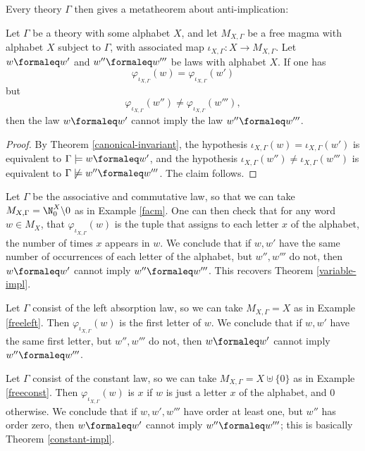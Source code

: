 Every theory $\Gamma$ then gives a metatheorem about anti-implication:

\begin{corollary}\label{anti-impl}
  Let $\Gamma$ be a theory with some alphabet $X$, and let $M_{X,\Gamma}$ be a free magma with alphabet $X$ subject to $\Gamma$, with associated map $\iota_{X,\Gamma}: X \to M_{X,\Gamma}$. Let $w \formaleq w'$ and $w'' \formaleq w'''$ be laws with alphabet $X$. If one has
  \[
  \varphi_{\iota_{X,\Gamma}}(w) = \varphi_{\iota_{X,\Gamma}}(w')
  \]
  but
  \[
  \varphi_{\iota_{X,\Gamma}}(w'') \neq \varphi_{\iota_{X,\Gamma}}(w'''),
  \]
  then the law $w \formaleq w'$ cannot imply the law $w'' \formaleq w'''$.
\end{corollary}

\begin{proof}
  By Theorem \ref{canonical-invariant}, the hypothesis $\iota_{X,\Gamma}(w) = \iota_{X,\Gamma}(w')$ is equivalent to $\Gamma \models w \formaleq w'$, and the hypothesis $\iota_{X,\Gamma}(w'') \neq \iota_{X,\Gamma}(w''')$ is equivalent to $\Gamma \not\models w'' \formaleq w'''$. The claim follows.
\end{proof}

\begin{example}
  Let $\Gamma$ be the associative and commutative law, so that we can take $M_{X,\Gamma} = \N_0^X \backslash 0$ as in Example \ref{facm}. One can then check that for any word $w \in M_X$, that $\varphi_{\iota_{X,\Gamma}}(w)$ is the tuple that assigns to each letter $x$ of the alphabet, the number of times $x$ appears in $w$. We conclude that if $w,w'$ have the same number of occurrences of each letter of the alphabet, but $w'', w'''$ do not, then $w \formaleq w'$ cannot imply $w'' \formaleq w'''$. This recovers Theorem \ref{variable-impl}.
\end{example}

\begin{example}
  Let $\Gamma$ consist of the left absorption law, so we can take $M_{X,\Gamma} = X$ as in Example \ref{freeleft}. Then $\varphi_{\iota_{X,\Gamma}}(w)$ is the first letter of $w$. We conclude that if $w,w'$ have the same first letter, but $w'', w'''$ do not, then $w \formaleq w'$ cannot imply $w'' \formaleq w'''$.
\end{example}

\begin{example}
  Let $\Gamma$ consist of the constant law, so we can take $M_{X,\Gamma} = X \uplus \{0\}$ as in Example \ref{freeconst}. Then $\varphi_{\iota_{X,\Gamma}}(w)$ is $x$ if $w$ is just a letter $x$ of the alphabet, and $0$ otherwise. We conclude that if $w,w', w'''$ have order at least one, but $w''$ has order zero, then $w \formaleq w'$ cannot imply $w'' \formaleq w'''$; this is basically Theorem \ref{constant-impl}.
\end{example}

